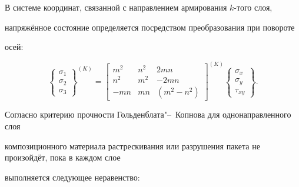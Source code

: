 В системе координат, связанной с направлением армирования $k$-того слоя,

напряжённое состояние определяется посредством преобразования при повороте

осей:

\begin{equation}

\label{bitkina:eq13}

\left\{ \begin{array}{c}

\sigma _1   \\

\sigma _2   \\

\sigma _3

\end{array} \right\}^{( K )}= \begin{bmatrix}

m^2   & n^2   & 2mn   \\

n^2   & m^2   & -2mn   \\

-mn   & mn   & ( m^2-n^2)

\end{bmatrix}^{( K )}\left\{ \begin{array}{c}

\sigma _x    \\

\sigma _y    \\

\tau _{xy}

\end{array} \right\}.

\end{equation}



Согласно критерию прочности Гольденблата"--~Копнова для однонаправленного слоя

композиционного материала растрескивания или разрушения пакета не произойдёт, пока в каждом слое

выполняется следующее неравенство:

